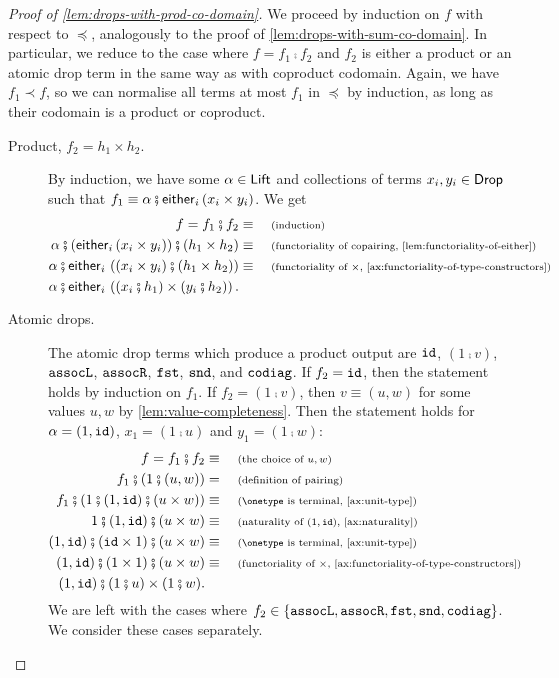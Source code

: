 \begin{proof}[Proof of \cref{lem:drops-with-prod-co-domain}]
	We proceed by induction on $f$ with respect to $\preceq$, analogously to the proof of \cref{lem:drops-with-sum-co-domain}. In particular, we reduce to the case where $f = f_1 \comp f_2$ and $f_2$ is either a product or an atomic drop term in the same way as with coproduct codomain. Again, we have $f_1 \prec f$, so we can normalise all terms at most $f_1$ in $\preceq$ by induction, as long as their codomain is a product or coproduct.

	\begin{description}
		\item[Product, $f_2 = h_1 \times h_2$.] By induction, we have some $\alpha \in \mathsf{Lift}$ and collections of terms $x_i, y_i \in \mathsf{Drop}$ such that $f_1 \equiv \alpha \comp \eithermany{i}{(x_i \times y_i)}$. We get
		\begin{align*}
			f = f_1 \comp f_2 \equalbecause{induction} \\ 
			\alpha \comp \left(\eithermany{i}{(x_i \times y_i)} \right) \comp (h_1 \times h_2) \equalbecause{functoriality of copairing, \cref{lem:functoriality-of-either}} \\
			\alpha \comp \eithermany{i}{\left( (x_i \times y_i) \comp (h_1 \times h_2)\right)} \equalbecause{functoriality of $\times$, \cref{ax:functoriality-of-type-constructors}} \\
			\alpha \comp \eithermany{i}{\left( \left( x_i \comp h_1 \right) \times \left( y_i \comp h_2 \right) \right)}.
		\end{align*}

		\item[Atomic drops.] The atomic drop terms which produce a product output are $\mathtt{id}$, $(1\comp{}v)$, $\mathtt{assocL}$, $\mathtt{assocR}$, $\mathtt{fst}$, $\mathtt{snd}$, and $\mathtt{codiag}$. If $f_2 = \mathtt{id}$, then the statement holds by induction on $f_1$. If $f_2 = (1 \comp v)$, then $v \equiv (u, w)$ for some values $u, w$ by \cref{lem:value-completeness}. Then the statement holds for $\alpha = (1, \mathtt{id})$, $x_1 = (1 \comp u)$ and $y_1 = (1 \comp w)$:
		\begin{align*}
			f = f_1 \comp f_2 \equalbecause{the choice of $u, w$} \\ 
			f_1 \comp (1 \comp (u, w)) &= \why{definition of pairing} \\ 
			f_1 \comp (1 \comp \unitlterm \comp (u \times w)) \equalbecause{$\onetype$ is terminal, \cref{ax:unit-type}} \\
			1 \comp \unitlterm \comp (u \times w) \equalbecause{naturality of $\unitlterm$, \cref{ax:naturality}} \\
			\unitlterm \comp (\idterm \times 1) \comp (u \times w) \equalbecause{$\onetype$ is terminal, \cref{ax:unit-type}} \\
			\unitlterm \comp (1 \times 1) \comp (u \times w) \equalbecause{functoriality of $\times$, \cref{ax:functoriality-of-type-constructors}} \\
			\unitlterm \comp (1 \comp u) \times (1 \comp w).
		\end{align*}
		We are left with the cases where $f_2 \in \{ \mathtt{assocL}, \mathtt{assocR}, \mathtt{fst}, \mathtt{snd}, \mathtt{codiag} \}$. We consider these cases separately.
		

\end{description}
\end{proof}
